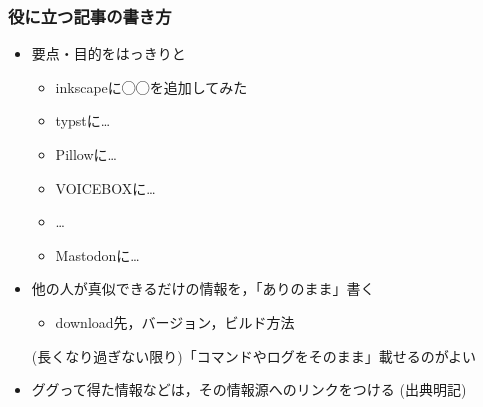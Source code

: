 \documentclass[12pt,dvipdfmx]{beamer}
\begin{document}
\begin{frame}
\frametitle{役に立つ記事の書き方}

\begin{itemize}
\item 要点・目的をはっきりと
  \begin{itemize}
    \iffalse    
  \item Libreoffice Calcの関数名補完機能を作ってみた
  \item inkscapeに中線機能入れてみた
  \item Pythonに ++ 入れてみた
    \fi
    \iffalse
  \item jsにパイプラインオペレータ入れてみた
  \item Chromeにあやしい履歴の非表示機能入れてみた
  \item fishにwaitコマンド入れてみた
  \item \ldots
    \fi
    \iffalse
  \item CodiMDのPDF出力機能を数式に対応させてみた
  \item MuseScoreのキーボードショートカットを◯◯してみた
  \item VSCodeのread onlyモードをイケてる感じにしてみた
  \item inkscapeで「全レイヤに表示されるオブジェクト」を追加してみた
  \item Remminaで逆方向接続(サーバ$\rightarrow$クライアント)できるようにしてみた
  \item VimでJupyterみたいなことができるようにしてみた
  \item \ldots
    \fi
    \iffalse
  \item Linuxカーネルを拡張するときのノウハウ
  \item Python処理系に◯◯を追加してみた
  \item 動画編集ソフトOpenShotに◯◯を追加してみた
  \item inkscapeに◯◯を追加してみた
  \item \ldots
    \fi
  \item inkscapeに◯◯を追加してみた
  \item typstに\ldots
  \item Pillowに\ldots
  \item VOICEBOXに\ldots
  \item \ldots
  \item Mastodonに\ldots
  \end{itemize}

\item 他の人が真似できるだけの情報を，「ありのまま」書く
  \begin{itemize}
  \item download先，バージョン，ビルド方法
  \end{itemize}
(長くなり過ぎない限り)「コマンドやログをそのまま」載せるのがよい

\item ググって得た情報などは，その情報源へのリンクをつける
(出典明記)
\end{itemize}
\end{frame}
\end{document}
